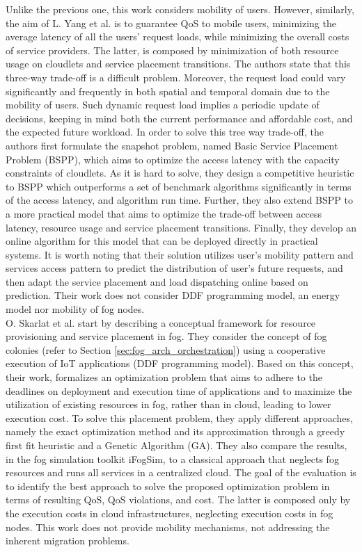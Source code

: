 \noindent\tab Unlike the previous one, this work considers mobility of users. However, similarly, the aim of L. Yang et al. \cite{yang2016cost} is to guarantee QoS to mobile users, minimizing the average latency of all the users’ request loads, while minimizing the overall costs of service providers. The latter, is composed by minimization of both resource usage on cloudlets and service placement transitions. The authors state that this three-way trade-off is a difficult problem. Moreover, the request load could vary significantly and frequently in both spatial and temporal domain due to the mobility of users. Such dynamic request load implies a periodic update of decisions, keeping in mind both the current performance and affordable cost, and the expected future workload. In order to solve this tree way trade-off, the authors first formulate the snapshot problem, named Basic Service Placement Problem (BSPP), which aims to optimize the access latency with the capacity constraints of cloudlets. As it is hard to solve, they design a competitive heuristic to BSPP which outperforms a set of benchmark algorithms significantly in terms of the access latency, and algorithm run time. Further, they also extend BSPP to a more practical model that aims to optimize the trade-off between access latency, resource usage and service placement transitions. Finally, they develop an online algorithm for this model that can be deployed directly in practical systems. It is worth noting that their solution utilizes user’s mobility pattern and services access pattern to predict the distribution of user’s future requests, and then adapt the service placement and load dispatching online based on prediction. Their work does not consider DDF programming model, an energy model nor mobility of fog nodes.\\
\noindent\tab O. Skarlat et al. \cite{skarlat2017optimized} start by describing a conceptual framework for resource provisioning and service placement in fog. They consider the concept of fog colonies (refer to Section \ref{sec:fog_arch_orchestration}) using a cooperative execution of IoT applications (DDF programming model). Based on this concept, their work, formalizes an optimization problem that aims to adhere to the deadlines on deployment and execution time of applications and to maximize the utilization of existing resources in fog, rather than in cloud, leading to lower execution cost. To solve this placement problem, they apply different approaches, namely the exact optimization method and its approximation through a greedy first fit heuristic and a Genetic Algorithm (GA). They also compare the results, in the fog simulation toolkit iFogSim, to a classical approach that neglects fog resources and runs all services in a centralized cloud. The goal of the evaluation is to identify the best approach to solve the proposed optimization problem in terms of resulting QoS, QoS violations, and cost. The latter is composed only by the execution costs in cloud infrastructures, neglecting execution costs in fog nodes. This work does not provide mobility mechanisms, not addressing the inherent migration problems.\\
